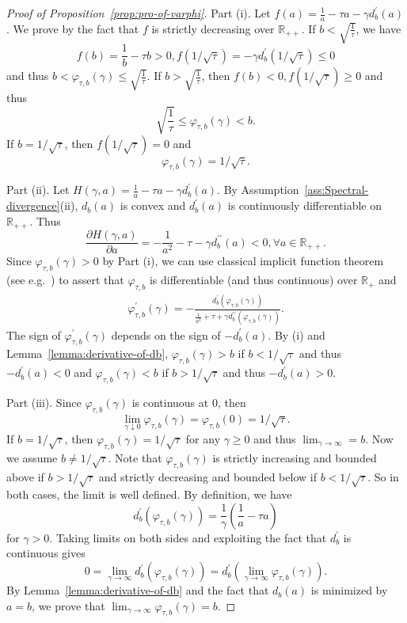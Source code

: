 \documentclass[11pt]{article}
\def\R{\mathbb{R}}
\def\R{\mathbb{R}}
\begin{document}
\begin{proof}[Proof of Proposition~\ref{prop:pro-of-varphi}]
    Part (i). Let $f(a) = \frac{1}{a}-\tau a-\gamma d^\prime_b(a)$. We prove by the fact that $f$ is strictly decreasing over $\R_{++}$. If $b < \sqrt{\frac{1}{\tau}}$, we have 
    $$
    f(b) = \frac{1}{b}-\tau b> 0, f(1/\sqrt{\tau})=-\gamma d_b^\prime (1/\sqrt{\tau})\leq 0
    $$
    and thus $b< \varphi_{\tau, b}(\gamma)\leq \sqrt{\frac{1}{\tau}} $. If $b > \sqrt{\frac{1}{\tau}}$, then $f(b)< 0, f(1/\sqrt{\tau})\geq 0$ and thus $$
    \sqrt{\frac{1}{\tau}}\leq \varphi_{\tau, b}(\gamma)< b.
    $$
    If $b=1/\sqrt{\tau}$, then $f(1/\sqrt{\tau})=0$ and 
    $$
    \varphi_{\tau, b}(\gamma) = 1/\sqrt{\tau}.
    $$

    Part (ii). Let $H(\gamma, a)=\frac{1}{a}-\tau a - \gamma d_b^\prime(a)$. By Assumption~\ref{ass:Spectral-divergence}(ii), $d_b(a)$ is convex and $d_b^\prime(a)$ is continuously differentiable on $\R_{++}$. Thus 
    \[
        \frac{\partial H(\gamma, a)}{\partial a} = -\frac{1}{a^2}-\tau-\gamma d_b^{\prime\prime}(a) < 0, \forall a\in \R_{++}.
    \]
    Since $\varphi_{\tau,b}(\gamma)>0$ by Part (i), we can use classical implicit function theorem (see e.g.~\cite[Section 1.2]{dontchev2009implicit}) to assert that $\varphi_{\tau, b}$ is differentiable (and thus continuous) over $\R_{+}$ and
    \begin{align*}
        \varphi_{\tau, b}^\prime(\gamma) = -\frac{d_b^\prime(\varphi_{\tau, b}(\gamma))}{\frac{1}{a^2}+\tau+\gamma d_b^{\prime\prime}(\varphi_{\tau, b}(\gamma))}.
    \end{align*}
    The sign of $\varphi_{\tau, b}^\prime(\gamma)$ depends on the sign of $-d^\prime_b(a)$. By (i) and Lemma~\ref{lemma:derivative-of-db}, $\varphi_{\tau, b}(\gamma) > b$ if $b<1/\sqrt{\tau}$ and thus $-d^\prime_b(a)<0$ and $\varphi_{\tau, b}(\gamma) < b$ if $b>1/\sqrt{\tau}$ and thus $-d^\prime_b(a)>0$.

    Part (iii). Since $\varphi_{\tau,b}(\gamma)$ is continuous at $0$, then $$
    \lim_{\gamma\downarrow 0} \varphi_{\tau,b}(\gamma) = \varphi_{\tau,b}(0) = 1/\sqrt{\tau}.
    $$
    If $b=1/\sqrt{\tau}$, then $\varphi_{\tau,b}(\gamma)=1/\sqrt{\tau}$ for any $\gamma \geq 0$ and thus $\lim_{\gamma \to\infty}=b$. Now we assume $b\neq 1/\sqrt{\tau}$. Note that $\varphi_{\tau,b}(\gamma)$ is strictly increasing and bounded above if $b>1/\sqrt{\tau}$ and strictly decreasing and bounded below if $b<1/\sqrt{\tau}$. So in both cases, the limit is well defined. By definition, we have 
    \[
        d_b^\prime(\varphi_{\tau,b}(\gamma)) = \frac{1}{\gamma} \left(\frac{1}{a}-\tau a\right)
    \]
    for $\gamma>0$.
    Taking limits on both sides and exploiting the fact that $d_b^\prime$ is continuous gives
    \[
        0 = \lim_{\gamma\to\infty} d_b^\prime\left(\varphi_{\tau,b}(\gamma)\right)= d_b^\prime\left(\lim_{\gamma\to\infty} \varphi_{\tau,b}(\gamma)\right).
    \]
    By Lemma~\ref{lemma:derivative-of-db} and the fact that $d_b(a)$ is minimized by $a=b$, we prove that $\lim_{\gamma\to\infty} \varphi_{\tau,b}(\gamma) = b$.


\end{proof}
\end{document}
